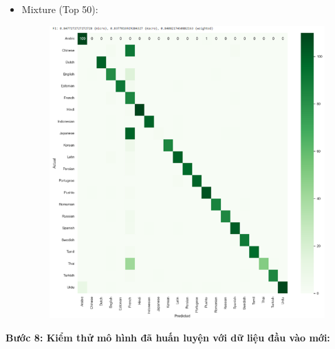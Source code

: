 \begin{itemize}
\begin{itemize}
\begin{figure}[H]
\end{figure}
\clearpage
        \item Mixture (Top 50):
        \begin{figure}[H]
    \centering
    \includegraphics[width=1\textwidth]{img/docspics/Picture39.png}
\end{figure}
    \end{itemize}
\end{itemize}
\clearpage
\textbf{Bước 8: Kiểm thử mô hình đã huấn luyện với dữ liệu đầu vào mới:}

